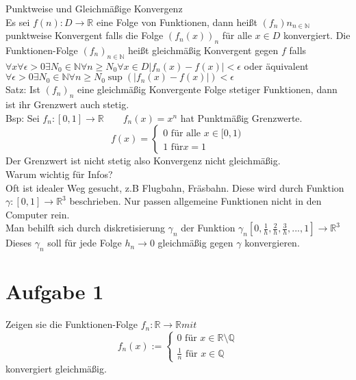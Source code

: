 \documentclass[11pt,a4paper]{article}
\begin{document}
	Punktweise und Gleichmäßige Konvergenz\\
		Es sei $f(n):D\rightarrow\mathbb{R}$ eine Folge von Funktionen, dann heißt $(f_n)n_{n\in \mathbb{N}}$ punktweise Konvergent falls die Folge $(f_n(x))_n$ für alle 	$x\in D$ konvergiert. Die Funktionen-Folge $(f_n)_{n\in  \mathbb{N}}$ heißt gleichmäßig Konvergent gegen $f$ falls\\
		 $\forall x \forall \epsilon>0 \exists N_0\in \mathbb{N} \forall n \geq N_0 \forall x \in D |f_n(x)-f(x)|<\epsilon$ oder äquivalent\\
		 $\forall \epsilon >0 \exists N_0\in \mathbb{N}\forall n\geq N_0 \sup(|f_n(x)-f(x)|)<\epsilon$\\
		 Satz: Ist $(f_n)_n$ eine gleichmäßig Konvergente Folge stetiger Funktionen, dann ist ihr Grenzwert auch stetig.\\
		 Bsp: Sei $f_n:[0,1]\rightarrow \mathbb{R}\qquad f_n(x)=x^n$ hat Punktmäßig Grenzwerte.\\
		 \begin{equation} 
   			f(x) = 
   			\begin{cases} 
     			0 \text{ für alle }x\in [0,1)\\
     			1 \text{ für} x=1
   			\end{cases} 
		\end{equation} 
		Der Grenzwert ist nicht stetig also Konvergenz nicht gleichmäßig.\\
		Warum wichtig für Infos?\\
		Oft ist idealer Weg gesucht, z.B Flugbahn, Fräsbahn. Diese wird durch Funktion $\gamma:[0,1]\rightarrow \mathbb{R}^3$ beschrieben. Nur passen allgemeine Funktionen nicht in den Computer rein.\\
		Man behilft sich durch diskretisierung $\gamma_n$ der Funktion $\gamma_n[0,\frac{1}{h},\frac{2}{h},\frac{3}{h},...,1]\rightarrow\mathbb{R}^3$\\
		Dieses $\gamma_n$ soll für jede Folge $h_n\rightarrow 0$ gleichmäßig gegen $\gamma$ konvergieren.\\
		\section*{Aufgabe 1} 
			Zeigen sie die Funktionen-Folge $f_n:\mathbb{R}\rightarrow\mathbb{R} mit$
			\begin{equation}
				f_n(x):=
				\begin{cases}
					0 \text{ für } x\in \mathbb{R}\text{\textbackslash}\mathbb{Q} \\
					\frac{1}{n} \text{ für } x\in \mathbb{Q}
				\end{cases}
			\end{equation}
			konvergiert gleichmäßig.
\end{document}
